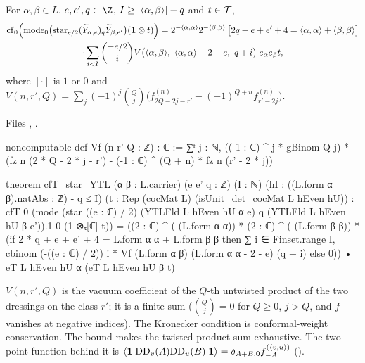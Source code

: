 \begin{theorem}\label{ch08:thm:cfstar}
For $\alpha,\beta\in L$, $e,e',q\in\Z$, $I\ge|\langle \alpha,\beta\rangle|-q$ and $t\in\mathcal{T}$,
\begin{multline*}
  \mathrm{cf}_0\Bigl(\mathrm{mode}_0\bigl(\mathrm{star}_{e/2}(\widetilde Y_{\alpha,e})_q\widetilde
  Y_{\beta,e'}\bigr)(\mathbf 1\otimes t)\Bigr)
  =2^{-\cheightpair\alpha\alpha}2^{-\cheightpair\beta\beta}\,
  \bigl[2q+e+e'+4=\cheightpair\alpha\alpha+\cheightpair\beta\beta\bigr]\\
  \cdot\sum_{i<I}\binom{-e/2}{i}V\bigl(\cheightpair\alpha\beta,\ \cheightpair\alpha\alpha-2-e,\ q+i\bigr)
  \;e_\alpha e_\beta t,
\end{multline*}
where $[\cdot]$ is $1$ or $0$ and
$V(n,r',Q)=\sum_j(-1)^j\binom Qj\bigl(f^{(n)}_{2Q-2j-r'}-(-1)^{Q+n}f^{(n)}_{r'-2j}\bigr)$.
\end{theorem}
\noindent Files , .
\begin{leancode}
noncomputable def Vf (n r' Q : ℤ) : ℂ :=
  ∑ᶠ j : ℕ, ((-1 : ℂ) ^ j * gBinom Q j)
    * (fz n (2 * Q - 2 * j - r') - (-1 : ℂ) ^ (Q + n) * fz n (r' - 2 * j))

theorem cfT_star_YTL (α β : L.carrier) (e e' q : ℤ) (I : ℕ)
    (hI : ((L.form α β).natAbs : ℤ) - q ≤ I)
    (t : Rep (cocMat L) (isUnit_det_cocMat L hEven hU)) :
    cfT 0 (mode (star ((e : ℂ) / 2) (YTLFld L hEven hU α e) q (YTLFld L hEven hU β e')).1 0
        (1 ⊗ₜ[ℂ] t))
      = ((2 : ℂ) ^ (-(L.form α α)) * (2 : ℂ) ^ (-(L.form β β))
          * (if 2 * q + e + e' + 4 = L.form α α + L.form β β then
              ∑ i ∈ Finset.range I, cbinom (-((e : ℂ) / 2)) i
                * Vf (L.form α β) (L.form α α - 2 - e) (q + i) else 0))
        • eT L hEven hU α (eT L hEven hU β t)
\end{leancode}
\begin{dictionary}
$V(n,r',Q)$ is the vacuum coefficient of the $Q$-th untwisted product of the two dressings on the
class $r'$; it is a finite sum ($\binom Qj=0$ for $Q\ge0$, $j>Q$, and $f$ vanishes at negative
indices).  The Kronecker condition is conformal-weight conservation.  The bound  makes
the twisted-product sum exhaustive.  The two-point function behind it is
$\langle\mathbf 1|\mathrm{DD}_v(A)\mathrm{DD}_u(B)|\mathbf 1\rangle=\delta_{A+B,0}f^{(\langle v,u\rangle)}_{-A}$
().
\end{dictionary}

